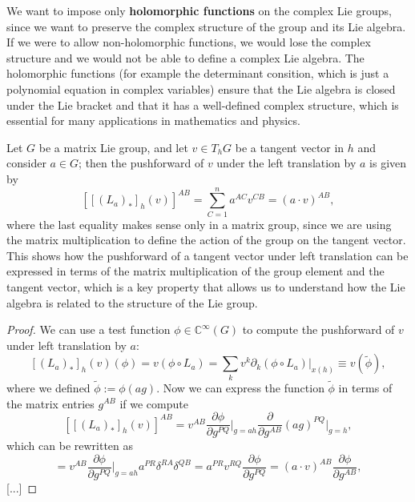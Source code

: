 We want to impose only \textbf{holomorphic functions} on the complex Lie groups, since we want to preserve the complex structure of the group and its Lie algebra. If we were to allow non-holomorphic functions, we would lose the complex structure and we would not be able to define a complex Lie algebra. The holomorphic functions (for example the determinant consition, which is just a polynomial equation in complex variables) ensure that the Lie algebra is closed under the Lie bracket and that it has a well-defined complex structure, which is essential for many applications in mathematics and physics.

\begin{lemma}
    Let \(G\) be a matrix Lie group, and let \(v \in T_h G\) be a tangent vector in \(h\) and consider \(a \in G\); then the pushforward of \(v\) under the left translation by \(a\) is given by
    \[
        [[(L_a)_*]_h(v)]^{AB} = \sum_{C=1}^n a^{AC} v^{CB} = (a \cdot v)^{AB},
    \]
    where the last equality makes sense only in a matrix group, since we are using the matrix multiplication to define the action of the group on the tangent vector. This shows how the pushforward of a tangent vector under left translation can be expressed in terms of the matrix multiplication of the group element and the tangent vector, which is a key property that allows us to understand how the Lie algebra is related to the structure of the Lie group.
\end{lemma}
\begin{proof}
    We can use a test function \(\phi \in \mathbb{C}^\infty(G)\) to compute the pushforward of \(v\) under left translation by \(a\):
    \[
        [(L_a)_*]_h(v)(\phi) = v(\phi \circ L_a) = \sum_{k} v^k \partial_k (\phi \circ L_a) \big|_{x(h)} \equiv v(\tilde{\phi}),
    \]
    where we defined \(\tilde{\phi} := \phi (ag)\). Now we can express the function \(\tilde{\phi}\) in terms of the matrix entries \(g^{AB}\) if we compute
    \[
        [[(L_a)_*]_h(v)]^{AB} = v^{AB} \frac{\partial \phi}{\partial g^{PQ}} \bigg|_{g = ah} \frac{\partial}{\partial g^{AB}} (ag)^{PQ} \bigg|_{g = h},
    \]
    which can be rewritten as
    \[
        = v^{AB} \frac{\partial \phi}{\partial g^{PQ}} \bigg|_{g = ah} a^{PR} \delta^{RA}\delta^{QB} = a^{PR} v^{RQ} \frac{\partial \phi}{\partial g^{PQ}} = (a \cdot v)^{AB} \frac{\partial \phi}{\partial g^{AB}},
    \]
    [...]
\end{proof}


